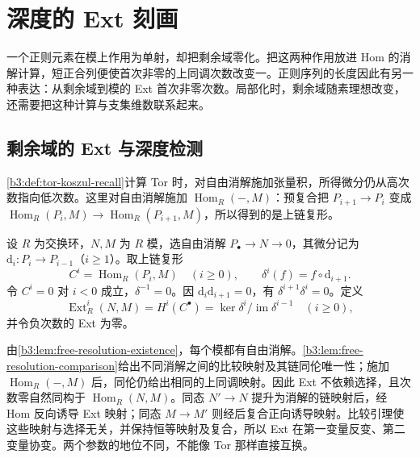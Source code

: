 
\section{深度的 Ext 刻画}
\label{b3:sec:1602}

一个正则元素在模上作用为单射，却把剩余域零化。把这两种作用放进 Hom 的消解计算，短正合列便使首次非零的上同调次数改变一。正则序列的长度因此有另一种表达：从剩余域到模的 Ext 首次非零次数。局部化时，剩余域随素理想改变，还需要把这种计算与支集维数联系起来。


%
%

\subsection{剩余域的 Ext 与深度检测}
\label{b3:subsec:1602:01}

\cref{b3:def:tor-koszul-recall}计算 Tor 时，对自由消解施加张量积，所得微分仍从高次数指向低次数。这里对自由消解施加 \(\operatorname{Hom}_R(-,M)\)：预复合把 \(P_{i+1}\to P_i\) 变成 \(\operatorname{Hom}_R(P_i,M)\to\operatorname{Hom}_R(P_{i+1},M)\)，所以得到的是上链复形。

\begin{definition}\label{b3:def:ext-minimum-background}
	设 \(R\) 为交换环，\(N,M\) 为 \(R\) 模，选自由消解 \(P_\bullet\rightarrow N\rightarrow0\)，其微分记为 \(\mathrm{d}_i:P_i\rightarrow P_{i-1}\)（\(i\ge1\)）。取上链复形
	\[
		C^i=\operatorname{Hom}_R(P_i,M)\quad(i\ge0),\qquad \delta^i(f)=f\circ \mathrm{d}_{i+1}.
	\]
	令 \(C^i=0\) 对 \(i<0\) 成立，\(\delta^{-1}=0\)。因 \(\mathrm{d}_i\mathrm{d}_{i+1}=0\)，有 \(\delta^{i+1}\delta^i=0\)。定义
	\[
		\operatorname{Ext}_R^i(N,M)=H^i(C^\bullet) =\ker\delta^i/\operatorname{im}\delta^{i-1}\quad(i\ge0),
	\]
	并令负次数的 Ext 为零。
\end{definition}

由\cref{b3:lem:free-resolution-existence}，每个模都有自由消解。\cref{b3:lem:free-resolution-comparison}给出不同消解之间的比较映射及其链同伦唯一性；施加 \(\operatorname{Hom}_R(-,M)\) 后，同伦仍给出相同的上同调映射。因此 Ext 不依赖选择，且次数零自然同构于 \(\operatorname{Hom}_R(N,M)\)。同态 \(N'\rightarrow N\) 提升为消解的链映射后，经 Hom 反向诱导 Ext 映射；同态 \(M\rightarrow M'\) 则经后复合正向诱导映射。比较引理使这些映射与选择无关，并保持恒等映射及复合，所以 Ext 在第一变量反变、第二变量协变。两个参数的地位不同，不能像 Tor 那样直接互换。


